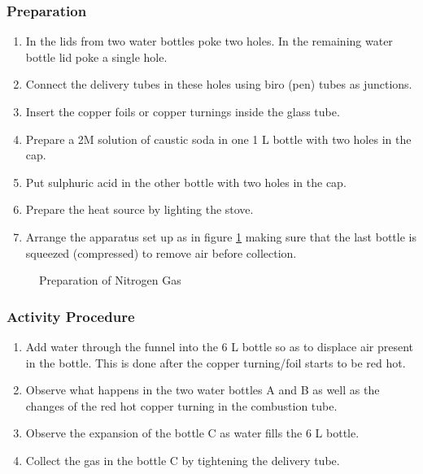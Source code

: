 \subsubsection*{Preparation}
\begin{enumerate}
\item{In the lids from two water bottles poke two holes. In the remaining water bottle lid poke a single hole.}
\item{Connect the delivery tubes in these holes using biro (pen) tubes as junctions.}
\item{Insert the copper foils or copper turnings inside the glass tube.}
\item{Prepare a 2M solution of caustic soda in one 1 L bottle with two holes in the cap.}
\item{Put sulphuric acid in the other bottle with two holes in the cap.}
\item{Prepare the heat source by lighting the stove.}
\item{Arrange the apparatus set up as in figure \ref{fig:nitrogen-prep} making sure that the last bottle is squeezed (compressed) to remove air before collection.}
\end{enumerate}

\begin{figure}[h]
\begin{center}
\def\svgwidth{400pt}

\caption{Preparation of Nitrogen Gas}
\label{fig:nitrogen-prep}
\end{center}
\end{figure}

\subsubsection*{Activity Procedure}
\begin{enumerate}
\item{Add water through the funnel into the 6 L bottle so as to displace air present in the bottle. This is done after the copper turning/foil starts to be red hot.}
\item{Observe what happens in the two water bottles A and B as well as the changes of the red hot copper turning in the combustion tube.}
\item{Observe the expansion of the bottle C as water fills the 6 L bottle.}
\item{Collect the gas in the bottle C by tightening the delivery tube.}
\end{enumerate}

